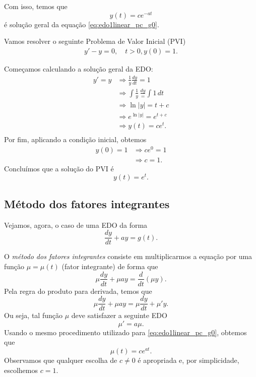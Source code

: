Com isso, temos que
\begin{equation}
  y(t) = ce^{-at}
\end{equation}
é solução geral da equação \eqref{eq:edo1linear_pc_g0}.

\begin{ex}
  Vamos resolver o seguinte Problema de Valor Inicial (PVI)
  \begin{align}
    y' - y = 0, \quad t>0,
    y(0) = 1.
  \end{align}
  
  Começamos calculando a solução geral da EDO:
  \begin{align}
    y' = y &\Rightarrow \frac{1}{y}\frac{dy}{dt} = 1 \\
            &\Rightarrow \int \frac{1}{y}\,\frac{dy} = \int 1\,dt \\
            &\Rightarrow \ln|y| = t + c \\
            &\Rightarrow e^{\ln|y|} = e^{t+c}\\
            &\Rightarrow y(t) = ce^{t}.\\
  \end{align}
  Por fim, aplicando a condição inicial, obtemos
  \begin{align}
    y(0) = 1 &\Rightarrow ce^{0} = 1 \\
             &\Rightarrow c = 1.
  \end{align}
  Concluímos que a solução do PVI é
  \begin{equation}
    y(t) = e^{t}.
  \end{equation}
\end{ex}

\subsection{Método dos fatores integrantes}

Vejamos, agora, o caso de uma EDO da forma
\begin{equation}\label{eq:edo1linear_pa_g}
  \frac{dy}{dt} + ay = g(t).
\end{equation}

O \emph{método dos fatores integrantes} consiste em multiplicarmos a equação por uma função $\mu = \mu(t)$ (fator integrante) de forma que
\begin{equation}
  \mu\frac{dy}{dt} + \mu ay = \frac{d}{dt}\left(\mu y\right).
\end{equation}
Pela regra do produto para derivada, temos que
\begin{equation}
  \mu\frac{dy}{dt} + \mu ay = \mu\frac{dy}{dt} + \mu'y.
\end{equation}
Ou seja, tal função $\mu$ deve satisfazer a seguinte EDO
\begin{equation}
  \mu' = a\mu.
\end{equation}
Usando o mesmo procedimento utilizado para \eqref{eq:edo1linear_pc_g0}, obtemos que
\begin{equation}
  \mu(t) = ce^{at}.
\end{equation}
Observamos que qualquer escolha de $c\neq 0$ é apropriada e, por simplicidade, escolhemos $c=1$.

